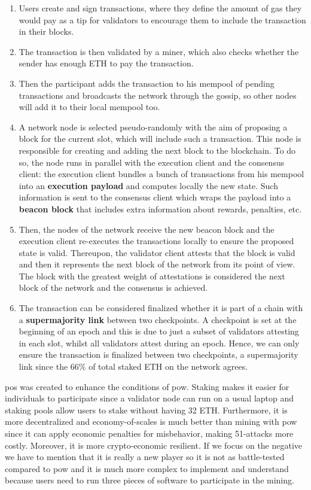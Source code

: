\documentclass[a4paper,12pt]{article}
\begin{document}
\begin{appendices}
{\begin{enumerate}
    \item Users create and sign transactions, where they define the amount of gas they would pay as a \gls{tip} for validators to encourage them to include the transaction in their blocks. 
    \item The transaction is then validated by a miner, which also checks whether the sender has enough ETH to pay the transaction.
    \item Then the participant adds the transaction to his mempool of pending transactions and broadcasts the network through the \gls{gossip}, so other nodes will add it to their local mempool too.
    \item A network node is selected pseudo-randomly with the aim of proposing a block for the current slot, which will include such a transaction. This node is responsible for creating and adding the next block to the blockchain. To do so, the node runs in parallel with the execution client and the consensus client: the execution client bundles a bunch of transactions from his mempool into an \textbf{execution payload} and computes locally the new state. Such information is sent to the consensus client which wraps the payload into a \textbf{beacon block} that includes extra information about rewards, penalties, etc.
    \item Then, the nodes of the network receive the new beacon block and the execution client re-executes the transactions locally to ensure the proposed state is valid. Thereupon, the validator client attests that the block is valid and then it represents the next block of the network from its point of view. The block with the greatest weight of attestations is considered the next block of the network and the consensus is achieved.
    \item The transaction can be considered finalized whether it is part of a chain with a \textbf{supermajority link} between two checkpoints. A checkpoint is set at the beginning of an epoch and this is due to just a subset of validators attesting in each slot, whilst all validators attest during an epoch. Hence, we can only ensure the transaction is finalized between two checkpoints, a supermajority link since the 66\% of total staked ETH on the network agrees.
\end{enumerate}

{\acrlong{pos} was created to enhance the conditions of \acrlong{pow}. Staking makes it easier for individuals to participate since a validator node can run on a usual laptop and staking pools allow users to stake without having 32 ETH. Furthermore, it is more decentralized and \glspl{economy-of-scale} is much better than mining with \acrshort{pow} since it can apply economic penalties for misbehavior, making \glspl{51-attack} more costly. Moreover, it is more crypto-economic resilient. If we focus on the negative we have to mention that it is really a new player so it is not as battle-tested compared to \acrlong{pow} and it is much more complex to implement and understand because users need to run three pieces of software to participate in the mining.}

}
\end{appendices}
\end{document}
